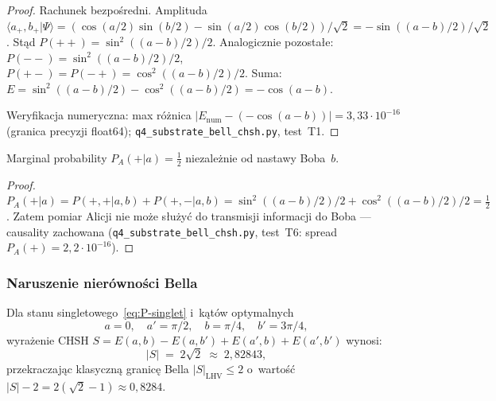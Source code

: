 \begin{proof}
Rachunek bezpośredni.
Amplituda $\langle a_+, b_+|\Psi\rangle
= (\cos(a/2)\sin(b/2) - \sin(a/2)\cos(b/2))/\sqrt{2}
= -\sin((a-b)/2)/\sqrt{2}$.
Stąd $P(++) = \sin^2((a-b)/2)/2$. Analogicznie pozostałe:
$P(--) = \sin^2((a-b)/2)/2$, $P(+-) = P(-+) = \cos^2((a-b)/2)/2$.
Suma: $E = \sin^2((a-b)/2) - \cos^2((a-b)/2) = -\cos(a-b)$.

Weryfikacja numeryczna: max różnica $|E_{\mathrm{num}} - (-\cos(a-b))|
= 3{,}33 \cdot 10^{-16}$ (granica precyzji float64);
\texttt{q4\_substrate\_bell\_chsh.py}, test~T1.
\end{proof}

\begin{corollary}[No-signaling]\label{cor:P-no-signaling}
Marginal probability $P_A(+|a) = \tfrac{1}{2}$ niezależnie
od nastawy Boba~$b$.
\end{corollary}

\begin{proof}
$P_A(+|a) = P(+,+|a,b) + P(+,-|a,b)
= \sin^2((a-b)/2)/2 + \cos^2((a-b)/2)/2 = \tfrac{1}{2}$.
Zatem pomiar Alicji nie może służyć do transmisji informacji
do Boba --- causality zachowana (\texttt{q4\_substrate\_bell\_chsh.py},
test~T6: spread $P_A(+) = 2{,}2 \cdot 10^{-16}$).
\end{proof}

\subsubsection{Naruszenie nierówności Bella}%
\label{sssec:P-bell}

\begin{theorem}%
\label{thm:P-bell-tsirelson}
Dla stanu singletowego~\eqref{eq:P-singlet} i~kątów optymalnych
\begin{equation}
  a = 0,\quad a' = \pi/2,\quad
  b = \pi/4,\quad b' = 3\pi/4,
\end{equation}
wyrażenie CHSH $S = E(a,b) - E(a,b') + E(a',b) + E(a',b')$ wynosi:
\begin{equation}\label{eq:P-CHSH-max}
  \boxed{
    |S| \;=\; 2\sqrt{2} \;\approx\; 2{,}82843,
  }
\end{equation}
przekraczając klasyczną granicę Bella $|S|_{\mathrm{LHV}} \leq 2$
o~wartość $|S| - 2 = 2(\sqrt{2} - 1) \approx 0{,}8284$.
\end{theorem}

